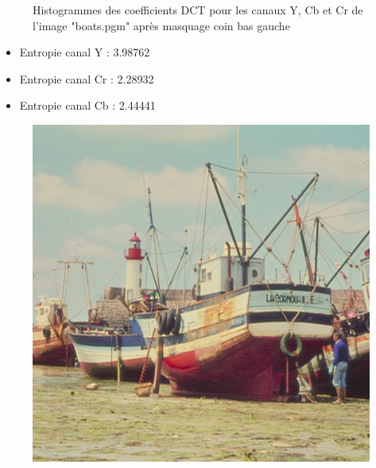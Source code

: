 \documentclass[12pt]{report}
\begin{document}
\begin{figure}[H]
\begin{center}
\caption{Histogrammes des coefficients DCT pour les canaux Y, Cb et Cr de l'image "boats.pgm" après masquage coin bas gauche}
\end{center}
\end{figure}

\begin{itemize}
\item Entropie canal Y : 3.98762
\item Entropie canal Cr : 2.28932
\item Entropie canal Cb : 2.44441\\
\end{itemize}

\begin{figure}[H]
\begin{center}
\includegraphics[scale=0.4]{../ImageRes/idct_masked2_result.jpg} 

\end{center}
\end{figure}
\end{document}
